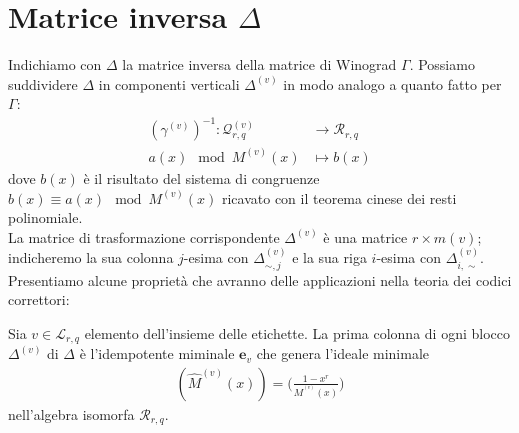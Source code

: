 \section{Matrice inversa $\Delta$}
Indichiamo con $\Delta$ la matrice inversa della matrice di Winograd $\Gamma$. Possiamo suddividere $\Delta$ in componenti verticali $\Delta^{(v)}$ in modo analogo a quanto fatto per $\Gamma$:
\begin{align*}
  (\gamma^{(v)})^{-1} :  \mathcal{Q}_{r,q}^{(v)}
  & \longrightarrow
  \mathcal{R}_{r,q}
   \\
  a(x) \mod{M^{(v)}(x)}
  &\longmapsto
  b(x)
\end{align*}
dove $b(x)$ è il risultato del sistema di congruenze $b(x) \equiv a(x) \mod{M^{(v)} (x) }$ ricavato con il teorema cinese dei resti polinomiale. \\
La matrice di trasformazione corrispondente $\Delta^{(v)}$ è una matrice $r\times m(v)$; indicheremo la sua colonna $j$-esima con $\Delta_{\sim, j}^{(v)}$ e la sua riga $i$-esima con $\Delta_{i, \sim}^{(v)}$.\\
Presentiamo alcune proprietà che avranno delle applicazioni nella teoria dei codici correttori:
\begin{prop} \label{prop:idempotGeneratori}
   Sia $v \in \mathscr{L}_{r,q}$ elemento dell'insieme delle etichette. La prima colonna di ogni blocco $\Delta^{(v)}$ di $\Delta$ è l'idempotente miminale $\mathbf{e}_{v}$ che genera l'ideale minimale
   \begin{align*}
      (\hat{M}^{(v)}(x)) = \Big(\frac{1-x^r}{M^{^(v)}(x)} \Big)
   \end{align*}
    nell'algebra isomorfa $\mathcal{R}_{r,q}$.
\end{prop}

